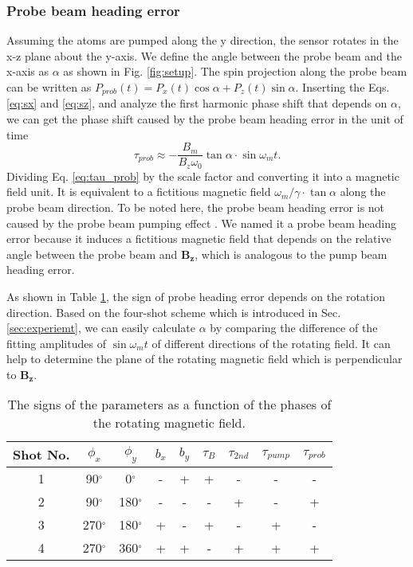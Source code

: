 \documentclass[prx,twocolumn,10pt,nofootinbib]{revtex4-1}
\begin{document}
\subsubsection{Probe beam heading error}
Assuming the atoms are pumped along the y direction, the sensor rotates in the x-z plane about the y-axis. We define the angle between the probe beam and the x-axis as $\alpha$ as shown in Fig. \ref{fig:setup}. The spin projection along the probe beam can be written as $P_{prob}(t) = P_x(t) \cos \alpha + P_z(t) \sin \alpha$. Inserting the Eqs. \ref{eq:sx} and \ref{eq:sz}, and analyze the first harmonic phase shift that depends on $\alpha$, we can get the phase shift caused by the probe beam heading error in the unit of time
\begin{equation}
	\tau_{prob}\approx -\frac{B_m}{B_z \omega_0}\tan \alpha \cdot \sin \omega_m t.
	\label{eq:tau_prob}
\end{equation}
Dividing Eq. \ref{eq:tau_prob} by the scale factor and converting it into a magnetic field unit. It is equivalent to a fictitious magnetic field $\omega_m /\gamma \cdot \tan \alpha $ along the probe beam direction. To be noted here, the probe beam heading error is not caused by the probe beam pumping effect \cite{fang2014situ}. We named it a probe beam heading error because it induces a fictitious magnetic field that depends on the relative angle between the probe beam and $\bm{B_z}$, which is analogous to the pump beam heading error.

As shown in Table \ref{table:trans_sign}, the sign of probe heading error depends on the rotation direction. Based on the four-shot scheme which is introduced in Sec. \ref{sec:experiemt}, we can easily calculate $\alpha$ by comparing the difference of the fitting amplitudes of $\sin \omega_m t$ of different directions of the rotating field. It can help to determine the plane of the rotating magnetic field which is perpendicular to $\bm{B_z}$. 

\begin{table}[]
\begin{tabular}{|c|c|c|c|c|c|c|c|c|}
\hline
\textbf{Shot No.} &
  \textbf{$\phi_x$} &
  \textbf{$\phi_y$} &
  \textbf{$b_x$} &
  \textbf{$b_y$} &
  \textbf{$\tau_B$} &
  \textbf{$\tau_{2nd}$} &
  \textbf{$\tau_{pump}$} &
  \textbf{$\tau_{prob}$} \\ \hline
1 & 90$^{\circ}$  & 0$^{\circ}$   & - & + & + & - & - & - \\ \hline
2 & 90$^{\circ}$  & 180$^{\circ}$ & - & - & - & + & - & + \\ \hline
3 & 270$^{\circ}$ & 180$^{\circ}$ & + & - & + & - & + & - \\ \hline
4 & 270$^{\circ}$ & 360$^{\circ}$ & + & + & - & + & + & + \\ \hline
\end{tabular}
\caption{The signs of the parameters as a function of the phases of the rotating magnetic field.}
\label{table:trans_sign}
\end{table}
\end{document}
